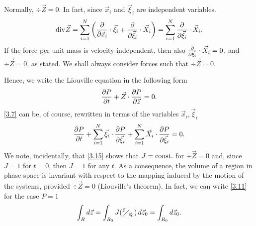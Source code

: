 Normally, \(\div \vec{Z} = 0\). In fact, since \(\vec{x}_i\) and \(\vec{\xi}_i\) are independent variables. 
\begin{equation}
    \div \vec{Z} = \sum_{i = 1}^{N} \left( \pderivative{\vec{x}_i} \cdot \vec{\xi}_i + \pderivative{\vec{\xi}_i} \cdot \vec{X}_i \right) = \sum_{i=1}^{N} \pderivative{\vec{\xi}_i} \cdot \vec{X}_i. \label{3.6}
\end{equation}
If the force per unit mass is velocity-independent, then also \(\pderivative{\vec{\xi}_i} \cdot \vec{X}_i = 0\), and \(\div \vec{Z} = 0\), as stated. We shall always consider forces such that \(\div \vec{Z} = 0\). 

Hence, we write the Liouville equation in the following form
\begin{equation}
    \partialderivative{P}{t} + \vec{Z} \cdot \partialderivative{P}{\vec{z}} = 0. \label{3.7}
\end{equation}
\eqref{3.7} can be, of course, rewritten in terms of the variables \(\vec{x}_i, \vec{\xi}_i\)
\begin{equation}
    \partialderivative{P}{t} + \sum_{i=1}^{N} \vec{\xi}_i \cdot \partialderivative{P}{\vec{\xi}_i} + \sum_{i=1}^{N} \vec{X}_i \cdot \partialderivative{P}{\vec{\xi}_i} = 0. \label{3.8}
\end{equation}
We note, incidentally, that \eqref{3.15} shows that \(J = \text{const.}\) for \(\div \vec{Z} = 0\) and, since \(J=1\) for \(t=0\), then \(J=1\) for any \(t\). As a consequence, the volume of a region in phase space is invariant with respect to the mapping induced by the motion of the systems, provided \(\div \vec{Z} = 0\) (Liouville's theorem). In fact, we can write \eqref{3.11} for the case \(P = 1\)
\begin{equation}
    \int_R d\vec{z} = \int_{R_0} J({}^{\vec{z}}{\mskip -5mu\diagup\mskip -3mu}_{\vec{z}_0}) \, d\vec{z}_0 = \int_{R_0} d\vec{z}_0. \label{3.16}
\end{equation}